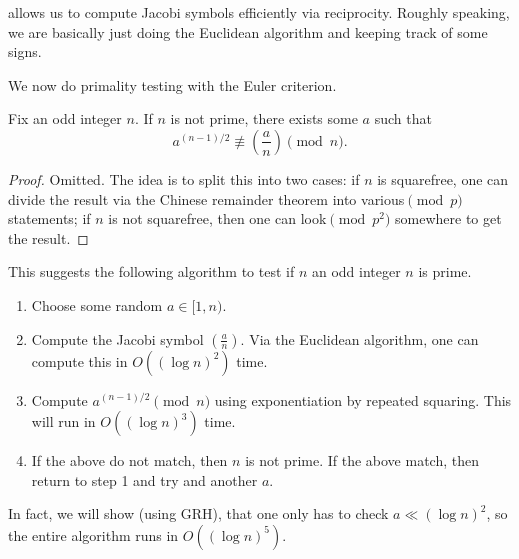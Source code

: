 \documentclass[../notes.tex]{subfiles}
\begin{document}
\begin{remark}
	 allows us to compute Jacobi symbols efficiently via reciprocity. Roughly speaking, we are basically just doing the Euclidean algorithm and keeping track of some signs.
\end{remark}
We now do primality testing with the Euler criterion.
\begin{lemma}
	Fix an odd integer $n$. If $n$ is not prime, there exists some $a$ such that
	\[a^{(n-1)/2}\not\equiv\left(\frac an\right)\pmod n.\]
\end{lemma}
\begin{proof}
	Omitted. The idea is to split this into two cases: if $n$ is squarefree, one can divide the result via the Chinese remainder theorem into various$\pmod p$ statements; if $n$ is not squarefree, then one can look$\pmod{p^2}$ somewhere to get the result.
\end{proof}
This suggests the following algorithm to test if $n$ an odd integer $n$ is prime.
\begin{enumerate}
	\item Choose some random $a\in[1,n)$.
	\item Compute the Jacobi symbol $\left(\frac an\right)$. Via the Euclidean algorithm, one can compute this in $O\left((\log n)^2\right)$ time.
	\item Compute $a^{(n-1)/2}\pmod n$ using exponentiation by repeated squaring. This will run in $O\left((\log n)^3\right)$ time.
	\item If the above do not match, then $n$ is not prime. If the above match, then return to step 1 and try and another $a$.
\end{enumerate}
In fact, we will show (using GRH), that one only has to check $a\ll(\log n)^2$, so the entire algorithm runs in $O\left((\log n)^5\right)$.
\end{document}
